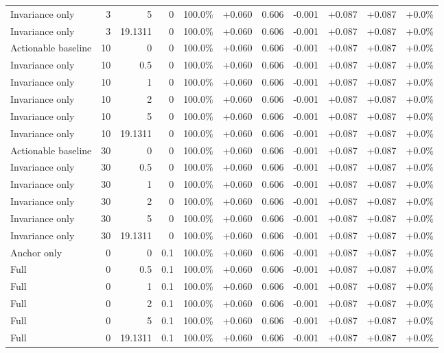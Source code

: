 \begin{table}[htbp]
\begin{tabular}{lrrrccccccc}
Invariance only & 3 & 5 & 0 & 100.0\% & +0.060 & 0.606 & -0.001 & +0.087 & +0.087 & +0.0\% \\
Invariance only & 3 & 19.1311 & 0 & 100.0\% & +0.060 & 0.606 & -0.001 & +0.087 & +0.087 & +0.0\% \\
Actionable baseline & 10 & 0 & 0 & 100.0\% & +0.060 & 0.606 & -0.001 & +0.087 & +0.087 & +0.0\% \\
Invariance only & 10 & 0.5 & 0 & 100.0\% & +0.060 & 0.606 & -0.001 & +0.087 & +0.087 & +0.0\% \\
Invariance only & 10 & 1 & 0 & 100.0\% & +0.060 & 0.606 & -0.001 & +0.087 & +0.087 & +0.0\% \\
Invariance only & 10 & 2 & 0 & 100.0\% & +0.060 & 0.606 & -0.001 & +0.087 & +0.087 & +0.0\% \\
Invariance only & 10 & 5 & 0 & 100.0\% & +0.060 & 0.606 & -0.001 & +0.087 & +0.087 & +0.0\% \\
Invariance only & 10 & 19.1311 & 0 & 100.0\% & +0.060 & 0.606 & -0.001 & +0.087 & +0.087 & +0.0\% \\
Actionable baseline & 30 & 0 & 0 & 100.0\% & +0.060 & 0.606 & -0.001 & +0.087 & +0.087 & +0.0\% \\
Invariance only & 30 & 0.5 & 0 & 100.0\% & +0.060 & 0.606 & -0.001 & +0.087 & +0.087 & +0.0\% \\
Invariance only & 30 & 1 & 0 & 100.0\% & +0.060 & 0.606 & -0.001 & +0.087 & +0.087 & +0.0\% \\
Invariance only & 30 & 2 & 0 & 100.0\% & +0.060 & 0.606 & -0.001 & +0.087 & +0.087 & +0.0\% \\
Invariance only & 30 & 5 & 0 & 100.0\% & +0.060 & 0.606 & -0.001 & +0.087 & +0.087 & +0.0\% \\
Invariance only & 30 & 19.1311 & 0 & 100.0\% & +0.060 & 0.606 & -0.001 & +0.087 & +0.087 & +0.0\% \\
Anchor only & 0 & 0 & 0.1 & 100.0\% & +0.060 & 0.606 & -0.001 & +0.087 & +0.087 & +0.0\% \\
Full & 0 & 0.5 & 0.1 & 100.0\% & +0.060 & 0.606 & -0.001 & +0.087 & +0.087 & +0.0\% \\
Full & 0 & 1 & 0.1 & 100.0\% & +0.060 & 0.606 & -0.001 & +0.087 & +0.087 & +0.0\% \\
Full & 0 & 2 & 0.1 & 100.0\% & +0.060 & 0.606 & -0.001 & +0.087 & +0.087 & +0.0\% \\
Full & 0 & 5 & 0.1 & 100.0\% & +0.060 & 0.606 & -0.001 & +0.087 & +0.087 & +0.0\% \\
Full & 0 & 19.1311 & 0.1 & 100.0\% & +0.060 & 0.606 & -0.001 & +0.087 & +0.087 & +0.0\% \\

\end{tabular}
\end{table}
